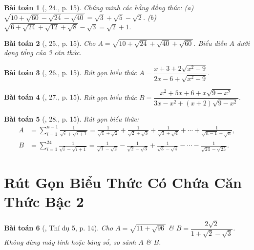 \documentclass{article}
\newtheorem{baitoan}{Bài toán}
\begin{document}
\begin{baitoan}[\cite{Binh_Toan_9_tap_1}, 24., p. 15]
	Chứng minh các hằng đẳng thức: (a) $\sqrt{10 + \sqrt{60} - \sqrt{24} - \sqrt{40}} = \sqrt{3} + \sqrt{5} - \sqrt{2}$. (b) $\sqrt{6 + \sqrt{24} + \sqrt{12} + \sqrt{8}} - \sqrt{3} = \sqrt{2} + 1$.
\end{baitoan}

\begin{baitoan}[\cite{Binh_Toan_9_tap_1}, 25., p. 15]
	Cho $A = \sqrt{10 + \sqrt{24} + \sqrt{40} + \sqrt{60}}$. Biểu diễn $A$ dưới dạng tổng của 3 căn thức.
\end{baitoan}

\begin{baitoan}[\cite{Binh_Toan_9_tap_1}, 26., p. 15]
	Rút gọn biểu thức $A = \dfrac{x + 3 + 2\sqrt{x^2 - 9}}{2x - 6 + \sqrt{x^2 - 9}}$.
\end{baitoan}

\begin{baitoan}[\cite{Binh_Toan_9_tap_1}, 27., p. 15]
	Rút gọn biểu thức $B = \dfrac{x^2 + 5x + 6 + x\sqrt{9 - x^2}}{3x - x^2 + (x + 2)\sqrt{9 - x^2}}$.
\end{baitoan}

\begin{baitoan}[\cite{Binh_Toan_9_tap_1}, 28., p. 15]
	Rút gọn biểu thức:
	\begin{align*}
		A &= \sum_{i=1}^{n-1} \frac{1}{\sqrt{i} + \sqrt{i + 1}} = \frac{1}{\sqrt{1} + \sqrt{2}} + \frac{1}{\sqrt{2} + \sqrt{3}} + \frac{1}{\sqrt{3} + \sqrt{4}} + \cdots + \frac{1}{\sqrt{n - 1} + \sqrt{n}},\\
		B &= \sum_{i=1}^{24} \frac{1}{\sqrt{i} - \sqrt{i + 1}} = \frac{1}{\sqrt{1} - \sqrt{2}} - \frac{1}{\sqrt{2} - \sqrt{3}} + \frac{1}{\sqrt{3} - \sqrt{4}} - \cdots - \frac{1}{\sqrt{24} - \sqrt{25}}.
	\end{align*}
\end{baitoan}


\section{Rút Gọn Biểu Thức Có Chứa Căn Thức Bậc 2}

\begin{baitoan}[\cite{Tuyen_Toan_9}, Thí dụ 5, p. 14]
	Cho $A = \sqrt{11 + \sqrt{96}}$ \& $B = \dfrac{2\sqrt{2}}{1 + \sqrt{2} - \sqrt{3}}$. Không dùng máy tính hoặc bảng số, so sánh $A$ \& $B$.
\end{baitoan}
\end{document}
